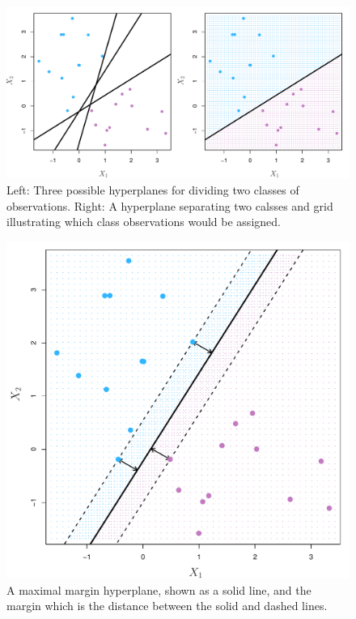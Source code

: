 \documentclass[11pt]{article}
\begin{document}
\begin{figure}[ht]
  \centering
  \includegraphics[width=12cm]{graphics/9_2.pdf}
  \caption{Left: Three possible hyperplanes for dividing two classes of observations. Right: A hyperplane separating two calsses and grid illustrating which class observations would be assigned.}
\end{figure}

\begin{figure}[ht]
  \centering
  \includegraphics[width=12cm]{graphics/9_3.pdf}
  \caption{A maximal margin hyperplane, shown as a solid line, and the margin which is the distance between the solid and dashed lines.}
\end{figure}
\end{document}
